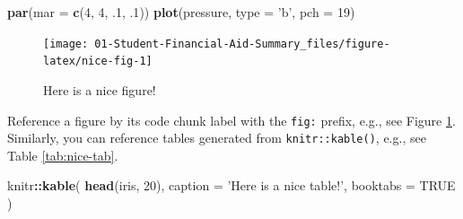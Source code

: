 \documentclass[
]{book}
\newenvironment{Shaded}{\begin{snugshade}}{\end{snugshade}}
\newcommand{\DataTypeTok}[1]{\textcolor[rgb]{0.13,0.29,0.53}{#1}}
\newcommand{\DecValTok}[1]{\textcolor[rgb]{0.00,0.00,0.81}{#1}}
\newcommand{\FloatTok}[1]{\textcolor[rgb]{0.00,0.00,0.81}{#1}}
\newcommand{\KeywordTok}[1]{\textcolor[rgb]{0.13,0.29,0.53}{\textbf{#1}}}
\newcommand{\NormalTok}[1]{#1}
\newcommand{\OperatorTok}[1]{\textcolor[rgb]{0.81,0.36,0.00}{\textbf{#1}}}
\newcommand{\OtherTok}[1]{\textcolor[rgb]{0.56,0.35,0.01}{#1}}
\newcommand{\StringTok}[1]{\textcolor[rgb]{0.31,0.60,0.02}{#1}}
\begin{document}
\begin{Shaded}
\begin{Highlighting}[]
\KeywordTok{par}\NormalTok{(}\DataTypeTok{mar =} \KeywordTok{c}\NormalTok{(}\DecValTok{4}\NormalTok{, }\DecValTok{4}\NormalTok{, }\FloatTok{.1}\NormalTok{, }\FloatTok{.1}\NormalTok{))}
\KeywordTok{plot}\NormalTok{(pressure, }\DataTypeTok{type =} \StringTok{'b'}\NormalTok{, }\DataTypeTok{pch =} \DecValTok{19}\NormalTok{)}
\end{Highlighting}
\end{Shaded}

\begin{figure}

{\centering \texttt{[image: 01-Student-Financial-Aid-Summary\_files/figure-latex/nice-fig-1]} 

}

\caption{Here is a nice figure!}\label{fig:nice-fig}
\end{figure}

Reference a figure by its code chunk label with the \texttt{fig:} prefix, e.g., see Figure \ref{fig:nice-fig}. Similarly, you can reference tables generated from \texttt{knitr::kable()}, e.g., see Table \ref{tab:nice-tab}.

\begin{Shaded}
\begin{Highlighting}[]
\NormalTok{knitr}\OperatorTok{::}\KeywordTok{kable}\NormalTok{(}
  \KeywordTok{head}\NormalTok{(iris, }\DecValTok{20}\NormalTok{), }\DataTypeTok{caption =} \StringTok{'Here is a nice table!'}\NormalTok{,}
  \DataTypeTok{booktabs =} \OtherTok{TRUE}
\NormalTok{)}
\end{Highlighting}
\end{Shaded}
\end{document}
